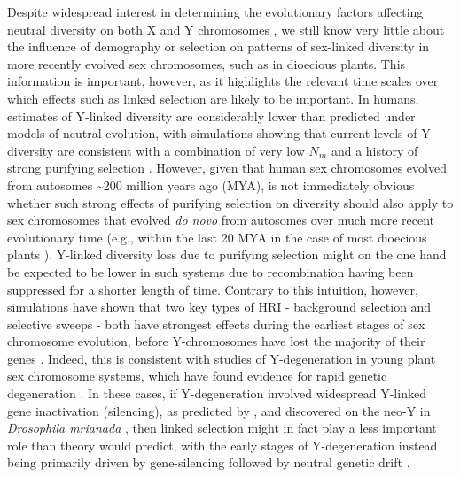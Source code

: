 \documentclass[9pt,twocolumn,twoside]{gsajnl}
\begin{document}
Despite widespread interest in determining the evolutionary factors affecting neutral diversity on both X and Y chromosomes \citep{ellegren2011,bachtrog2013NRG}, we still know very little about the influence of demography or selection on patterns of sex-linked diversity in more recently evolved sex chromosomes, such as in dioecious plants. This information is important, however, as it highlights the relevant time scales over which effects such as linked selection are likely to be important. In humans, estimates of Y-linked diversity are considerably lower than predicted under models of neutral evolution, with simulations showing that current levels of Y-diversity are consistent with a combination of very low $N_{m}$ and a history of strong purifying selection \citep{Wilsonsayres2014}. However, given that human sex chromosomes evolved from autosomes \textasciitilde 200 million years ago (MYA), is not immediately obvious whether such strong effects of purifying selection on diversity should also apply to sex chromosomes that evolved \textit{do novo} from autosomes over much more recent evolutionary time (e.g., within the last 20 MYA in the case of most dioecious plants \citep{charlesworth2015plant}). Y-linked diversity loss due to purifying selection might on the one hand be expected to be lower in such systems due to recombination having been suppressed for a shorter length of time. Contrary to this intuition, however, simulations have shown that two key types of HRI - background selection and selective sweeps - both have strongest effects during the earliest stages of sex chromosome evolution, before Y-chromosomes have lost the majority of their genes \citep{bachtrog2008temporal}. Indeed, this is consistent with studies of Y-degeneration in young plant sex chromosome systems, which have found evidence for rapid genetic degeneration \citep{hough2014,papadopulos2015,charlesworth2016plant}. In these cases, if Y-degeneration involved widespread Y-linked gene inactivation (silencing), as predicted by \citep{orr1998adaptive}, and discovered on the neo-Y in \textit{Drosophila mrianada} \citep{zhou2012chromosome}, then linked selection might in fact play a less important role than theory would predict, with the early stages of Y-degeneration instead being primarily driven by gene-silencing followed by neutral genetic drift \citep{bachtrog2013NRG}.

\end{document}
